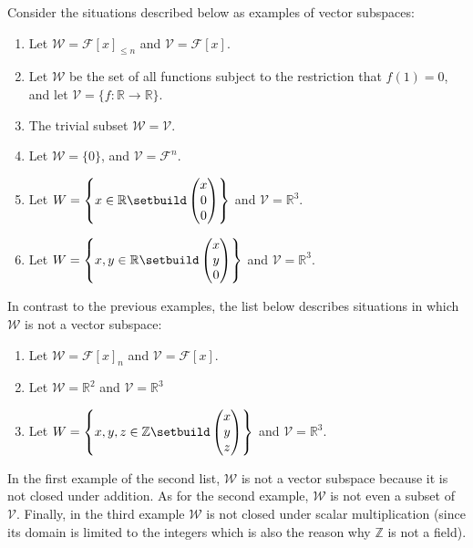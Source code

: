 \begin{exm}\label{exm-vector-subspaces}
	Consider the situations described below as examples of vector subspaces:
	\begin{enumerate}
		\item Let $\mathcal{W}=\mathcal{F}[x]_{\leq n}$ and $\mathcal{V}=\mathcal{F}[x]$.
		\item Let $\mathcal{W}$ be the set of all functions subject to the restriction
		      that $f(1)=0$, and let $\mathcal{V}=\{f:\mathbb{R}\rightarrow\mathbb{R}\}$.
		\item The trivial subset $\mathcal{W}=\mathcal{V}$.
		\item Let $\mathcal{W}=\{0\}$, and $\mathcal{V}=\mathcal{F}^n$.
		\item Let $W=\left\{x\in\mathbb{R}\setbuild\begin{pmatrix}x\\0\\0\end{pmatrix}\right\}$
		      and $\mathcal{V}=\mathbb{R}^3$.
		\item Let $W=\left\{x,y\in\mathbb{R}\setbuild\begin{pmatrix}x\\y\\0\end{pmatrix}\right\}$
		      and $\mathcal{V}=\mathbb{R}^3$.
	\end{enumerate}
	In contrast to the previous examples, the list below describes situations in
	which $\mathcal{W}$ is not a vector subspace:
	\begin{enumerate}
		\item Let $\mathcal{W}=\mathcal{F}[x]_n$ and $\mathcal{V}=\mathcal{F}[x]$.
		\item Let $\mathcal{W}=\mathbb{R}^2$ and $\mathcal{V}=\mathbb{R}^3$
		\item Let $W=\left\{x,y,z\in\mathbb{Z}\setbuild\begin{pmatrix}x\\y\\z\end{pmatrix}\right\}$
		      and $\mathcal{V}=\mathbb{R}^3$.
	\end{enumerate}
	In the first example of the second list, $\mathcal{W}$ is not a vector subspace
	because it is not closed under addition. As for the second example, $\mathcal{W}$
	is not even a subset of $\mathcal{V}$. Finally, in the third example $\mathcal{W}$
	is not closed under scalar multiplication (since its domain is limited to the
	integers which is also the reason why $\mathbb{Z}$ is not a field).
\end{exm}

